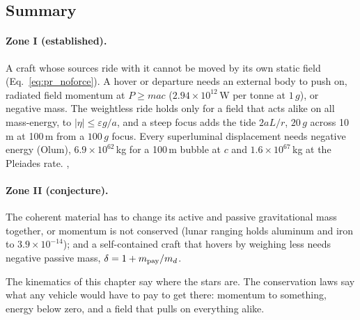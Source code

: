 \subsection{Summary}\label{sec:pr_summary}
\paragraph{Zone I (established).} A craft whose sources ride with it cannot be moved by its own static field (Eq.~\eqref{eq:pr_noforce}). A hover or
departure needs an external body to push on, radiated field momentum at $P\ge mac$ ($2.94\times10^{12}$\,W per tonne at $1\,g$), or negative mass.
The weightless ride holds only for a field that acts alike on all mass-energy, to $|\eta|\le\varepsilon g/a$, and a steep focus adds the tide
$2aL/r$, $20\,g$ across 10\,m at 100\,m from a $100\,g$ focus. Every superluminal displacement needs negative energy (Olum), $6.9\times10^{62}$\,kg
for a 100\,m bubble at $c$ and $1.6\times10^{67}$\,kg at the Pleiades rate. \derived, \calc

\paragraph{Zone II (conjecture).} The coherent material has to change its active and passive gravitational mass together, or momentum is not
conserved (lunar ranging holds aluminum and iron to $3.9\times10^{-14}$); and a self-contained craft that hovers by weighing less needs negative
passive mass, $\delta=1+m_{\rm pay}/m_d$. \conjecture

The kinematics of this chapter say where the stars are. The conservation laws say what any vehicle would have to pay to get there:
momentum to something, energy below zero, and a field that pulls on everything alike. \interp

